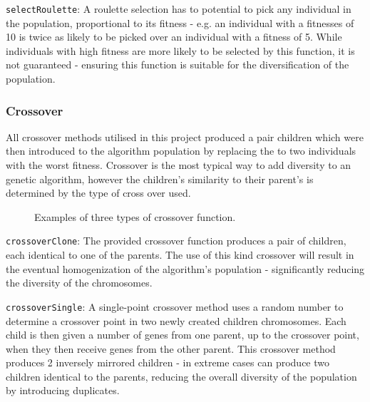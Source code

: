 			\texttt{selectRoulette}: A roulette selection has to potential to pick any individual in the population, proportional to its fitness - e.g. an individual with a fitnesses of 10 is twice as likely to be picked over an individual with a fitness of 5. While individuals with high fitness are more likely to be selected by this function, it is not guaranteed - ensuring this function is suitable for the diversification of the population.
		
		\subsubsection{Crossover}
			All  crossover methods utilised in this project produced a pair children which were then introduced to the algorithm population by replacing the to two individuals with the worst fitness. Crossover is the most typical way to add diversity to an genetic algorithm, however the children's similarity to their parent's is determined by the type of cross over used.
			
			\begin{figure*}[]
				\centering
				\hfil
				\newline
				\caption{Examples of three types of crossover function.}
				\label{fig_cross}
			\end{figure*}
	
			\texttt{crossoverClone}: The provided crossover function produces a pair of children, each identical to one of the parents. The use of this kind crossover will result in the eventual homogenization of the algorithm's population - significantly reducing the diversity of the chromosomes. 
		
			\texttt{crossoverSingle}: A single-point crossover method uses a random number to determine a crossover point in two newly created children chromosomes. Each child is then given a number of genes from one parent, up to the crossover point, when they then receive genes from the other parent. This crossover method produces 2 inversely mirrored children - in extreme cases can produce two children identical to the parents, reducing the overall diversity of the population by introducing duplicates. 
			
